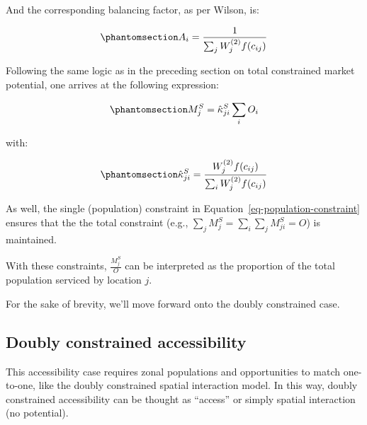 \documentclass[
]{article}
\begin{document}
And the corresponding balancing factor, as per Wilson, is:

\begin{equation}\phantomsection\label{eq-population-constrained-proportionality-constants}{
A_i = \frac{1}{\sum_j W_j^{(2)} f(c_{ij})}
}\end{equation}

Following the same logic as in the preceding section on total
constrained market potential, one arrives at the following expression:

\begin{equation}\phantomsection\label{eq-production-constrained-accessibility-with-proportional-allocation-factor}{
M^S_{j} = \hat \kappa^S_{ji} \sum_i  O_i
}\end{equation}

\noindent with:

\begin{equation}\phantomsection\label{eq-attraction-constrained-proportional-allocation-factor}{
\hat \kappa^S_{ji} = \frac{W_j^{(2)} f(c_{ij})}{\sum_i W_j^{(2)} f(c_{ij})}
}\end{equation}

As well, the single (population) constraint in
Equation~\ref{eq-population-constraint} ensures that the the total
constraint (e.g., \(\sum_j M^S_{j} = \sum_i\sum_j  M^S_{ji} = O\)) is
maintained.

With these constraints, \(\frac{M_j^S}{O}\) can be interpreted as the
proportion of the total population serviced by location \(j\).

For the sake of brevity, we'll move forward onto the doubly constrained
case.

\subsection{Doubly constrained
accessibility}\label{doubly-constrained-accessibility}

This accessibility case requires zonal populations and opportunities to
match one-to-one, like the doubly constrained spatial interaction model.
In this way, doubly constrained accessibility can be thought as
``access'' or simply spatial interaction (no potential).
\end{document}
